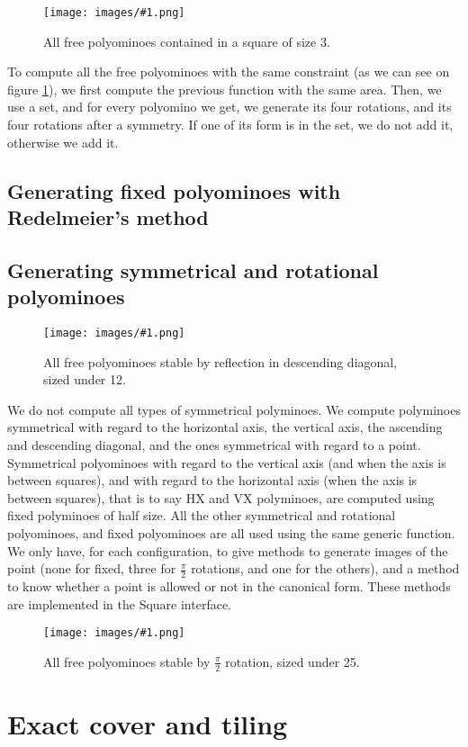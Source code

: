\documentclass[12pt]{article}
\newcommand{\illustration}[2]{
	\begin{figure}[]
	\begin{center}
	\texttt{[image: images/\#1.png]}
	\caption{#2}
	\label{fig:#1}
	\end{center}
	\end{figure}
}
\begin{document}
\illustration{free_3_3}{All free polyominoes contained in a square of size 3.}

To compute all the free polyominoes with the same constraint (as we can see on figure \ref{fig:free_3_3}), we first compute the previous function with the same area.
Then, we use a set, and for every polyomino we get, we generate its four rotations, and its four rotations after a symmetry.
If one of its form is in the set, we do not add it, otherwise we add it.

\subsection{Generating fixed polyominoes with Redelmeier’s method}



\subsection{Generating symmetrical and rotational polyominoes}

\illustration{diagonal}{All free polyominoes stable by reflection in descending diagonal, sized under 12.}

We do not compute all types of symmetrical polyminoes.
We compute polyminoes symmetrical with regard to the horizontal axis, the vertical axis, the ascending and descending diagonal, and the ones symmetrical with regard to a point.
Symmetrical polyominoes with regard to the vertical axis (and when the axis is between squares), and with regard to the horizontal axis (when the axis is between squares), that is to say HX and VX polyminoes, are computed using fixed polyminoes of half size.
All the other symmetrical and rotational polyominoes, and fixed polyominoes are all used using the same generic function.
We only have, for each configuration, to give methods to generate images of the point (none for fixed, three for $\frac{\pi}{2}$ rotations, and one for the others), and a method to know whether a point is allowed or not in the canonical form.
These methods are implemented in the Square interface.

\illustration{rotational_25}{All free polyominoes stable by $\frac{\pi}{2}$ rotation, sized under 25.}



\section{Exact cover and tiling}
\end{document}
